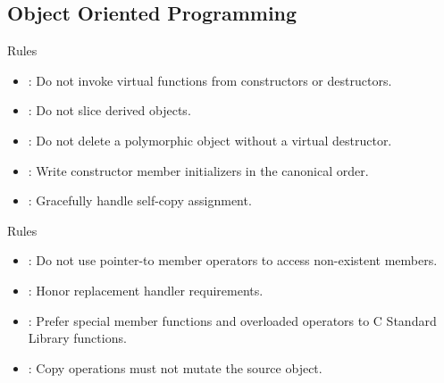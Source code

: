 \subsection{Object Oriented Programming}

\begin{frame}[t]{Rules}
\begin{itemize}
  \item {}: 
        Do not invoke virtual functions from constructors or destructors.
  \vfill
  \item {}: 
        Do not slice derived objects.
  \vfill
  \item {}: 
        Do not delete a polymorphic object without a virtual destructor.
  \vfill
  \item {}: 
        Write constructor member initializers in the canonical order.
  \vfill
  \item {}: 
        Gracefully handle self-copy assignment.
\end{itemize}
\end{frame}

\begin{frame}[t]{Rules}
\begin{itemize}
  \item {}: 
        Do not use pointer-to member operators to access non-existent members.
  \vfill
  \item {}: 
        Honor replacement handler requirements.
  \vfill
  \item {}: 
        Prefer special member functions and overloaded operators to C Standard Library functions.
  \vfill
  \item {}: 
        Copy operations must not mutate the source object.
\end{itemize}
\end{frame}

